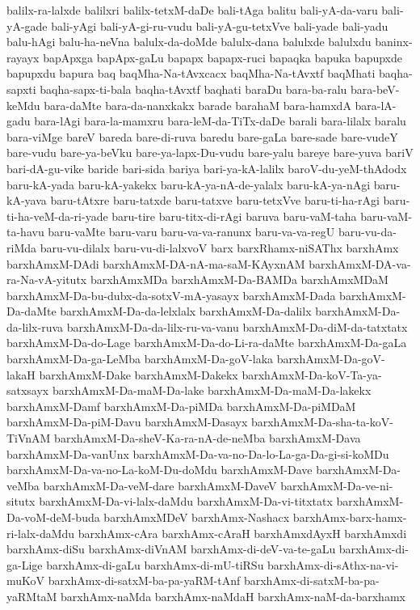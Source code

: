 {balilx-ra-lalxde
balilxri
balilx-tetxM-daDe
bali-tAga
balitu
bali-yA-da-varu
bali-yA-gade
bali-yAgi
bali-yA-gi-ru-vudu
bali-yA-gu-tetxVve
bali-yade
bali-yadu
balu-hAgi
balu-ha-neVna
balulx-da-doMde
balulx-dana
balulxde
balulxdu
baninx-rayayx
bapApxga
bapApx-gaLu
bapapx
bapapx-ruci
bapaqka
bapuka
bapupxde
bapupxdu
bapura
baq
baqMha-Na-tAvxcacx
baqMha-Na-tAvxtf
baqMhati
baqha-sapxti
baqha-sapx-ti-bala
baqha-tAvxtf
baqhati
baraDu
bara-ba-ralu
bara-beV-keMdu
bara-daMte
bara-da-nanxkakx
barade
barahaM
bara-hamxdA
bara-lA-gadu
bara-lAgi
bara-la-mamxru
bara-leM-da-TiTx-daDe
barali
bara-lilalx
baralu
bara-viMge
bareV
bareda
bare-di-ruva
baredu
bare-gaLa
bare-sade
bare-vudeY
bare-vudu
bare-ya-beVku
bare-ya-lapx-Du-vudu
bare-yalu
bareye
bare-yuva
bariV
bari-dA-gu-vike
baride
bari-sida
bariya
bari-ya-kA-lalilx
baroV-du-yeM-thAdodx
baru-kA-yada
baru-kA-yakekx
baru-kA-ya-nA-de-yalalx
baru-kA-ya-nAgi
baru-kA-yava
baru-tAtxre
baru-tatxde
baru-tatxve
baru-tetxVve
baru-ti-ha-rAgi
baru-ti-ha-veM-da-ri-yade
baru-tire
baru-titx-di-rAgi
baruva
baru-vaM-taha
baru-vaM-ta-havu
baru-vaMte
baru-varu
baru-va-va-ranunx
baru-va-va-regU
baru-vu-da-riMda
baru-vu-dilalx
baru-vu-di-lalxvoV
barx
barxRhamx-niSAThx
barxhAmx
barxhAmxM-DAdi
barxhAmxM-DA-nA-ma-saM-KAyxnAM
barxhAmxM-DA-va-ra-Na-vA-yitutx
barxhAmxMDa
barxhAmxM-Da-BAMDa
barxhAmxMDaM
barxhAmxM-Da-bu-dubx-da-sotxV-mA-yasayx
barxhAmxM-Dada
barxhAmxM-Da-daMte
barxhAmxM-Da-da-lelxlalx
barxhAmxM-Da-dalilx
barxhAmxM-Da-da-lilx-ruva
barxhAmxM-Da-da-lilx-ru-va-vanu
barxhAmxM-Da-diM-da-tatxtatx
barxhAmxM-Da-do-Lage
barxhAmxM-Da-do-Li-ra-daMte
barxhAmxM-Da-gaLa
barxhAmxM-Da-ga-LeMba
barxhAmxM-Da-goV-laka
barxhAmxM-Da-goV-lakaH
barxhAmxM-Dake
barxhAmxM-Dakekx
barxhAmxM-Da-koV-Ta-ya-satxsayx
barxhAmxM-Da-maM-Da-lake
barxhAmxM-Da-maM-Da-lakekx
barxhAmxM-Damf
barxhAmxM-Da-piMDa
barxhAmxM-Da-piMDaM
barxhAmxM-Da-piM-Davu
barxhAmxM-Dasayx
barxhAmxM-Da-sha-ta-koV-TiVnAM
barxhAmxM-Da-sheV-Ka-ra-nA-de-neMba
barxhAmxM-Dava
barxhAmxM-Da-vanUnx
barxhAmxM-Da-va-no-Da-lo-La-ga-Da-gi-si-koMDu
barxhAmxM-Da-va-no-La-koM-Du-doMdu
barxhAmxM-Dave
barxhAmxM-Da-veMba
barxhAmxM-Da-veM-dare
barxhAmxM-DaveV
barxhAmxM-Da-ve-ni-situtx
barxhAmxM-Da-vi-lalx-daMdu
barxhAmxM-Da-vi-titxtatx
barxhAmxM-Da-voM-deM-buda
barxhAmxMDeV
barxhAmx-Nashacx
barxhAmx-barx-hamx-ri-lalx-daMdu
barxhAmx-cAra
barxhAmx-cAraH
barxhAmxdAyxH
barxhAmxdi
barxhAmx-diSu
barxhAmx-diVnAM
barxhAmx-di-deV-va-te-gaLu
barxhAmx-di-ga-Lige
barxhAmx-di-gaLu
barxhAmx-di-mU-tiRSu
barxhAmx-di-sAthx-na-vi-muKoV
barxhAmx-di-satxM-ba-pa-yaRM-tAnf
barxhAmx-di-satxM-ba-pa-yaRMtaM
barxhAmx-naMda
barxhAmx-naMdaH
barxhAmx-naM-da-barxhamx
}
